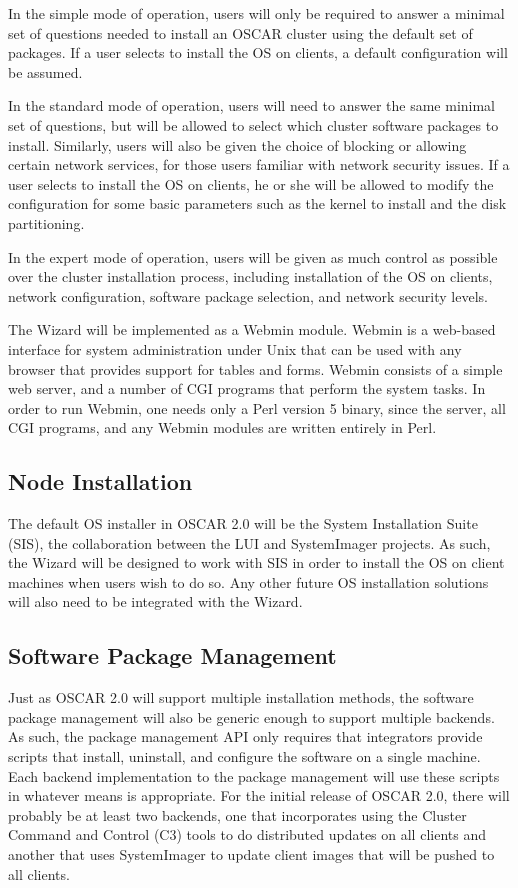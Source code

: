 In the simple mode of operation, users will only be required to answer
a minimal set of questions needed to install an OSCAR cluster using
the default set of packages. If a user selects to install the OS on
clients, a default configuration will be assumed.

In the standard mode of operation, users will need to answer the same
minimal set of questions, but will be allowed to select which cluster
software packages to install. Similarly, users will also be given the
choice of blocking or allowing certain network services, for those
users familiar with network security issues.  If a user selects to
install the OS on clients, he or she will be allowed to modify the
configuration for some basic parameters such as the kernel to install
and the disk partitioning.

In the expert mode of operation, users will be given as much control
as possible over the cluster installation process, including
installation of the OS on clients, network configuration, software
package selection, and network security levels.

The Wizard will be implemented as a Webmin module. Webmin is a
web-based interface for system administration under Unix that can be
used with any browser that provides support for tables and
forms. Webmin consists of a simple web server, and a number of CGI
programs that perform the system tasks. In order to run Webmin, one
needs only a Perl version 5 binary, since the server, all CGI
programs, and any Webmin modules are written entirely in Perl.

\subsection{Node Installation}

The default OS installer in OSCAR 2.0 will be the System Installation
Suite (SIS), the collaboration between the LUI and SystemImager
projects. As such, the Wizard will be designed to work with SIS in
order to install the OS on client machines when users wish to do
so. Any other future OS installation solutions will also need to be
integrated with the Wizard.

\subsection{Software Package Management}
\label{sec:design-software-package-mgmt}

Just as OSCAR 2.0 will support multiple installation methods, the
software package management will also be generic enough to support
multiple backends. As such, the package management API only requires
that integrators provide scripts that install, uninstall, and
configure the software on a single machine. Each backend
implementation to the package management will use these scripts in
whatever means is appropriate. For the initial release of OSCAR 2.0,
there will probably be at least two backends, one that incorporates
using the Cluster Command and Control (C3) tools to do distributed
updates on all clients and another that uses SystemImager to update
client images that will be pushed to all clients.

